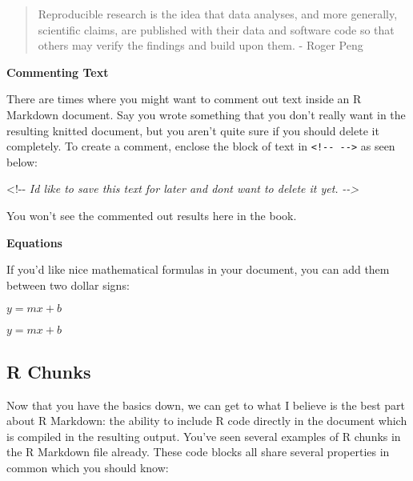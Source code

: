\documentclass[]{tufte-book}
\newenvironment{Shaded}{\begin{snugshade}}{\end{snugshade}}
\newcommand{\CommentTok}[1]{\textcolor[rgb]{0.56,0.35,0.01}{\textit{#1}}}
\newcommand{\NormalTok}[1]{#1}
\begin{document}
\begin{quote}
Reproducible research is the idea that data analyses, and more generally, scientific claims, are published with their data and software code so that others may verify the findings and build upon them. - Roger Peng
\end{quote}

\textbf{Commenting Text}

There are times where you might want to comment out text inside an R Markdown document. Say you wrote something that you don't really want in the resulting knitted document, but you aren't quite sure if you should delete it completely. To create a comment, enclose the block of text in \texttt{\textless{}!-\/-\ -\/-\textgreater{}} as seen below:

\begin{Shaded}
\begin{Highlighting}[]
\NormalTok{<!{-}{-}}
\CommentTok{I\textquotesingle{}d like to save this text for later and don\textquotesingle{}t want to delete it yet.}
\CommentTok{{-}{-}>}
\end{Highlighting}
\end{Shaded}

You won't see the commented out results here in the book.

\vspace*{0.2in}

\noindent\textbf{Equations}\vspace*{0.1in}

If you'd like nice mathematical formulas in your document, you can add them between two dollar signs:

\begin{Shaded}
\begin{Highlighting}[]
\NormalTok{$y = mx + b$}
\end{Highlighting}
\end{Shaded}

\(y = mx + b\)

\hypertarget{r-chunks}{%
\subsection{R Chunks}\label{r-chunks}}

Now that you have the basics down, we can get to what I believe is the best part about R Markdown: the ability to include R code directly in the document which is compiled in the resulting output. You've seen several examples of R chunks in the R Markdown file already. These code blocks all share several properties in common which you should know:
\end{document}

